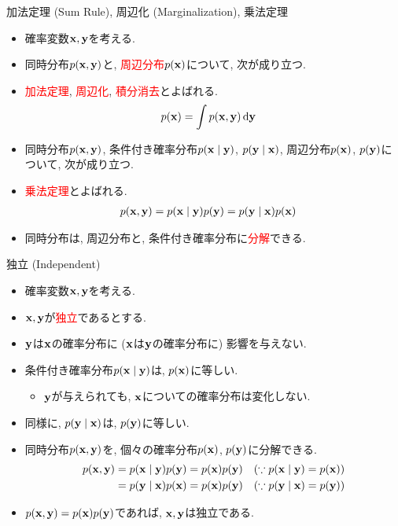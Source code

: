 \documentclass[dvipdfmx,notheorems,t]{beamer}
\begin{document}
\begin{frame}{加法定理 (Sum Rule), 周辺化 (Marginalization), 乗法定理}
\begin{itemize}
  \item 確率変数$\vb{x}, \vb{y}$を考える.
  \item 同時分布$p(\vb{x}, \vb{y})$と, \textcolor{red}{周辺分布}$p(\vb{x})$について, 次が成り立つ.
  \item \textcolor{red}{加法定理}, \textcolor{red}{周辺化}, \textcolor{red}{積分消去}とよばれる.
  \begin{align*}
    p(\vb{x}) &= \int p(\vb{x}, \vb{y}) \dd{\vb{y}}
  \end{align*}
  \item 同時分布$p(\vb{x}, \vb{y})$, 条件付き確率分布$p(\vb{x} \mid \vb{y})$, $p(\vb{y} \mid \vb{x})$,
  周辺分布$p(\vb{x})$, $p(\vb{y})$について, 次が成り立つ.
  \item \textcolor{red}{乗法定理}とよばれる.
  \begin{align*}
    p(\vb{x}, \vb{y}) &= p(\vb{x} \mid \vb{y}) p(\vb{y}) = p(\vb{y} \mid \vb{x}) p(\vb{x})
  \end{align*}
  \item 同時分布は, 周辺分布と, 条件付き確率分布に\textcolor{red}{分解}できる.
\end{itemize}
\end{frame}

\begin{frame}{独立 (Independent)}
\begin{itemize}
  \item 確率変数$\vb{x}, \vb{y}$を考える.
  \item $\vb{x}, \vb{y}$が\textcolor{red}{独立}であるとする.
  \item $\vb{y}$は$\vb{x}$の確率分布に ($\vb{x}$は$\vb{y}$の確率分布に) 影響を与えない.
  \item 条件付き確率分布$p(\vb{x} \mid \vb{y})$は, $p(\vb{x})$に等しい.
  \begin{itemize}
    \item $\vb{y}$が与えられても, $\vb{x}$についての確率分布は変化しない.
  \end{itemize}
  \item 同様に, $p(\vb{y} \mid \vb{x})$は, $p(\vb{y})$に等しい.
  \item 同時分布$p(\vb{x}, \vb{y})$を, 個々の確率分布$p(\vb{x})$, $p(\vb{y})$に分解できる.
  \begin{align*}
    p(\vb{x}, \vb{y}) &= p(\vb{x} \mid \vb{y}) p(\vb{y}) = p(\vb{x}) p(\vb{y}) \quad
      (\because p(\vb{x} \mid \vb{y}) = p(\vb{x})) \\
      &= p(\vb{y} \mid \vb{x}) p(\vb{x}) = p(\vb{x}) p(\vb{y}) \quad
      (\because p(\vb{y} \mid \vb{x}) = p(\vb{y}))
  \end{align*}
  \item $p(\vb{x}, \vb{y}) = p(\vb{x}) p(\vb{y})$であれば, $\vb{x}, \vb{y}$は独立である.
\end{itemize}
\end{frame}
\end{document}
